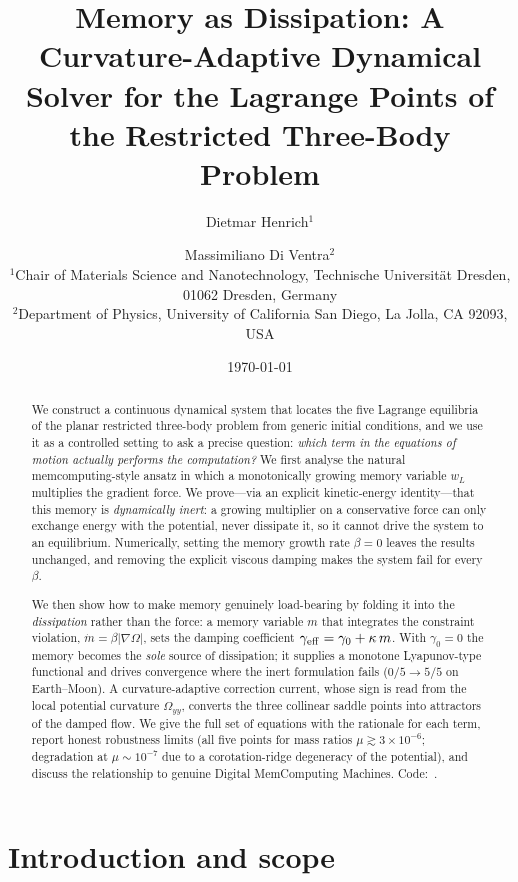 \documentclass[10pt,twocolumn]{article}
\title{\textbf{Memory as Dissipation: A Curvature-Adaptive Dynamical
Solver for the Lagrange Points of the Restricted Three-Body Problem}}
\author{
  Dietmar Henrich$^{1}$ \and Massimiliano Di Ventra$^{2}$\\[4pt]
  \small $^{1}$Chair of Materials Science and Nanotechnology,
  Technische Universit\"{a}t Dresden, 01062 Dresden, Germany\\
  \small $^{2}$Department of Physics, University of California San Diego,
  La Jolla, CA 92093, USA
}
\date{\today}
\begin{document}
\maketitle

\begin{abstract}
We construct a continuous dynamical system that locates the five Lagrange
equilibria of the planar restricted three-body problem from generic initial
conditions, and we use it as a controlled setting to ask a precise question:
\emph{which term in the equations of motion actually performs the
computation?} We first analyse the natural memcomputing-style ansatz in which a
monotonically growing memory variable $w_L$ multiplies the gradient force. We
prove---via an explicit kinetic-energy identity---that this memory is
\emph{dynamically inert}: a growing multiplier on a conservative force can only
exchange energy with the potential, never dissipate it, so it cannot drive the
system to an equilibrium. Numerically, setting the memory growth rate
$\beta\!=\!0$ leaves the results unchanged, and removing the explicit viscous
damping makes the system fail for every $\beta$.

We then show how to make memory genuinely load-bearing by folding it into the
\emph{dissipation} rather than the force: a memory variable $m$ that integrates
the constraint violation, $\dot m=\beta\lvert\nabla\Omega\rvert$, sets the
damping coefficient $\gamma_{\rm eff}=\gamma_0+\kappa\,m$. With $\gamma_0=0$ the
memory becomes the \emph{sole} source of dissipation; it supplies a monotone
Lyapunov-type functional and drives convergence where the inert formulation
fails ($0/5\!\to\!5/5$ on Earth--Moon). A curvature-adaptive correction current,
whose sign is read from the local potential curvature $\Omega_{yy}$, converts
the three collinear saddle points into attractors of the damped flow. We give
the full set of equations with the rationale for each term, report honest
robustness limits (all five points for mass ratios
$\mu\gtrsim 3\times10^{-6}$; degradation at $\mu\sim10^{-7}$ due to a
corotation-ridge degeneracy of the potential), and discuss the relationship to
genuine Digital MemComputing Machines. Code:~\cite{github2026}.
\end{abstract}

\section{Introduction and scope}
\end{document}

